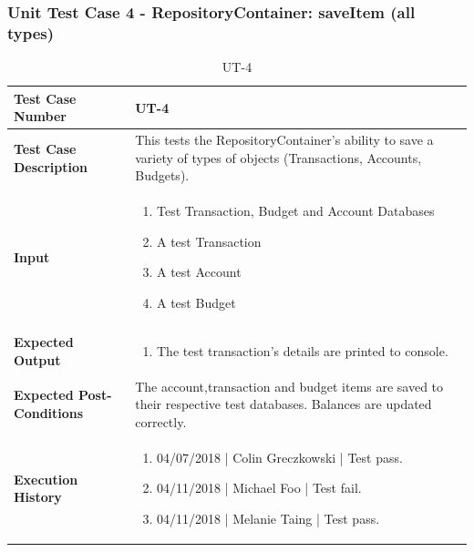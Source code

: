 \documentclass[12pt]{article}
\begin{document}
\subsubsection{Unit Test Case 4 - RepositoryContainer: saveItem (all types)}
\def\arraystretch{1.5}%
\begin{table}[htbp]
\centering
\caption {UT-4}
\label{UT-4}
\begin{tabularx}{\textwidth}{ | l | X |}
\hline
\textbf{Test Case Number}      &  UT-4                         \\ \hline
\textbf{Test Case Description}    &  This tests the RepositoryContainer's ability to save a variety of types of objects (Transactions, Accounts, Budgets).                \\ \hline
\textbf{Input}         & 	\begin{enumerate}
          \item Test Transaction, Budget and Account Databases
	\item A test Transaction
	\item A test Account
	\item A test Budget
\end{enumerate} \\ \hline

\textbf{Expected Output}     & \begin{enumerate}
	\item The test transaction's details are printed to console.
\end{enumerate} \\ \hline
\textbf{Expected Post-Conditions}           & The account,transaction and budget items are saved to their respective test databases. Balances are updated correctly.                \\ \hline
\textbf{Execution History}   &  \begin{enumerate}
	\item 04/07/2018 | Colin Greczkowski | Test pass.
	\item 04/11/2018 | Michael Foo | Test fail.
	\item 04/11/2018 | Melanie Taing | Test pass.
\end {enumerate} \\ \hline
\end{tabularx}
\end{table}
\clearpage

\end{document}
